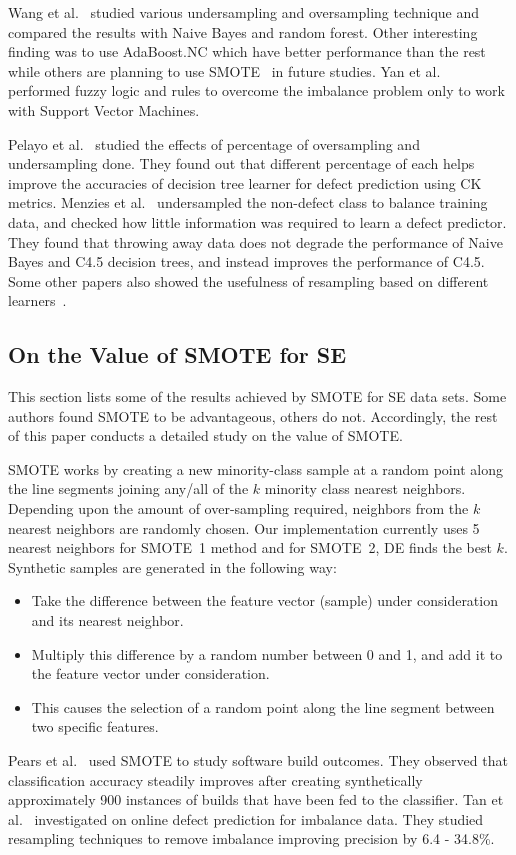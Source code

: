 \documentclass[sigconf,review, anonymous]{acmart}
\newcommand{\bi}{\begin{itemize}[leftmargin=0.4cm]}
\newcommand{\ei}{\end{itemize}}
\theoremstyle{break}
\theoremstyle{break}
\begin{document}
Wang et al.~\cite{wang2013using} studied various undersampling and oversampling technique and compared the results with Naive Bayes and random forest. Other interesting finding was to use AdaBoost.NC which have better performance than the rest while others are planning to use SMOTE~\cite{gray2009using} in future studies. Yan et al.~\cite{yan2010software} performed fuzzy logic and rules to overcome the imbalance problem only to work with Support Vector Machines. 

Pelayo et al.~\cite{pelayo2007applying} studied the effects of percentage of oversampling and undersampling done. They found out that different percentage of each helps improve the accuracies of decision tree learner for defect prediction using CK metrics. Menzies et al.~\cite{menzies2008implications} undersampled the non-defect class to balance training
data, and checked how little information was required to learn a defect predictor. They found that throwing away data does not degrade the performance of Naive Bayes and C4.5 decision trees, and instead improves the performance of C4.5. Some other papers also showed the usefulness of resampling based on different learners~\cite{pelayo2007applying, pelayo2012evaluating, riquelme2008finding}.

\subsection{On the Value of SMOTE for SE}
\label{sect:smote}

This section lists some of the results achieved by SMOTE for SE data sets. Some authors found SMOTE to be advantageous, others do not. Accordingly, the rest of this paper conducts a detailed study on the value of SMOTE.

SMOTE works by creating a new minority-class sample at a random point along the line
segments joining any/all of the $k$ minority class nearest neighbors. Depending upon the
amount of over-sampling required, neighbors from the $k$ nearest neighbors are randomly
chosen. Our implementation currently uses 5 nearest neighbors for SMOTE~1 method and for SMOTE~2, DE finds the best $k$. Synthetic samples
are generated in the following way:
\bi
\item
Take the difference between the feature vector (sample)
under consideration and its nearest neighbor.
\item
Multiply this difference by a random number
between 0 and 1, and add it to the feature vector under consideration.
\item
This causes the
selection of a random point along the line segment between two specific features.
\ei
Pears et al.~\cite{pears2014synthetic} used SMOTE to study software build outcomes. They observed
that classification accuracy steadily improves after creating synthetically approximately 900 instances of builds that have been fed to the classifier. Tan et al.~\cite{tan2015online} investigated on online defect prediction for imbalance data. They studied resampling techniques to remove imbalance improving precision by 6.4 - 34.8\%.
\end{document}

